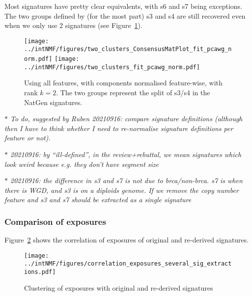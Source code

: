 \documentclass[11pt,a4paper,roman]{article}
\begin{document}
Most signatures have pretty clear equivalents, with s6 and s7 being exceptions. The two groups defined by (for the most part) s3 and s4 are still recovered even when we only use 2 signatures (see Figure~\ref{two_signatures}).

\begin{figure}[h]
\centering
\texttt{[image: ../intNMF/figures/two\_clusters\_ConsensusMatPlot\_fit\_pcawg\_norm.pdf]}
\texttt{[image: ../intNMF/figures/two\_clusters\_fit\_pcawg\_norm.pdf]}
\caption{Using all features, with components normalised feature-wise, with rank $k=2$. The two groups represent the split of s3/s4 in the NatGen signatures.\label{two_signatures}}
\end{figure}

\emph{$\ast$ To do, suggested by Ruben 20210916: compare signature definitions (although then I have to think whether I need to re-normalise signature definitions per feature or not).}

\emph{$\ast$ 20210916: by ``ill-defined'', in the review+rebuttal, we mean signatures which look weird because e.g. they don't have segment size}

\emph{$\ast$ 20210916: the difference in s3 and s7 is not due to brca/non-brca. s7 is when there is WGD, and s3 is on a diploids genome. If we remove the copy number feature and s3 and s7 should be extracted as a single signature}

\clearpage

\subsubsection{Comparison of exposures}
Figure~\ref{correlation_exposures} shows the correlation of exposures of original and re-derived signatures.

\begin{figure}[h]
\centering
\texttt{[image: ../intNMF/figures/correlation\_exposures\_several\_sig\_extractions.pdf]}
\caption{Clustering of exposures with original and re-derived signatures\label{correlation_exposures}}
\end{figure}
\end{document}
